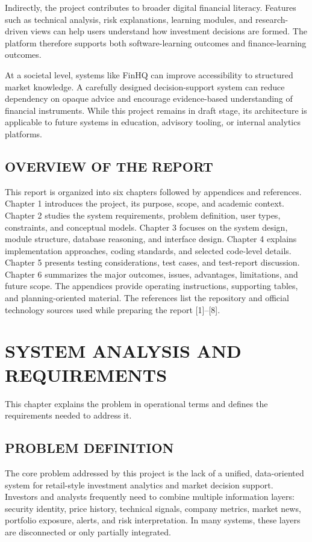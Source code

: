 \documentclass[12pt,a4paper]{report}
\newcommand{\projectshort}{FinHQ}
\begin{document}
Indirectly, the project contributes to broader digital financial literacy. Features such as technical analysis, risk explanations, learning modules, and research-driven views can help users understand how investment decisions are formed. The platform therefore supports both software-learning outcomes and finance-learning outcomes.

At a societal level, systems like \projectshort{} can improve accessibility to structured market knowledge. A carefully designed decision-support system can reduce dependency on opaque advice and encourage evidence-based understanding of financial instruments. While this project remains in draft stage, its architecture is applicable to future systems in education, advisory tooling, or internal analytics platforms.

\section{OVERVIEW OF THE REPORT}
This report is organized into six chapters followed by appendices and references. Chapter 1 introduces the project, its purpose, scope, and academic context. Chapter 2 studies the system requirements, problem definition, user types, constraints, and conceptual models. Chapter 3 focuses on the system design, module structure, database reasoning, and interface design. Chapter 4 explains implementation approaches, coding standards, and selected code-level details. Chapter 5 presents testing considerations, test cases, and test-report discussion. Chapter 6 summarizes the major outcomes, issues, advantages, limitations, and future scope. The appendices provide operating instructions, supporting tables, and planning-oriented material. The references list the repository and official technology sources used while preparing the report [1]--[8].

\chapter{SYSTEM ANALYSIS AND REQUIREMENTS}
This chapter explains the problem in operational terms and defines the requirements needed to address it.

\section{PROBLEM DEFINITION}
The core problem addressed by this project is the lack of a unified, data-oriented system for retail-style investment analytics and market decision support. Investors and analysts frequently need to combine multiple information layers: security identity, price history, technical signals, company metrics, market news, portfolio exposure, alerts, and risk interpretation. In many systems, these layers are disconnected or only partially integrated.
\end{document}
